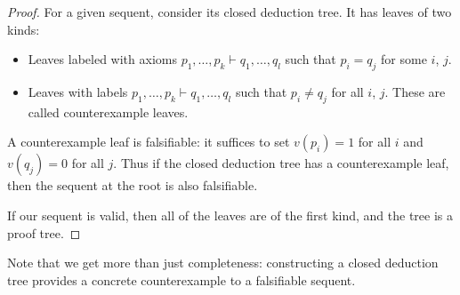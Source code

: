 

\setcounter{section}{2}
\setcounter{subsection}{8}
\setcounter{dfn}{19}

\begin{proof}
For a given sequent, consider its closed deduction tree.
It has leaves of two kinds:
\begin{itemize}
\item
Leaves labeled with axioms $p_1, \ldots, p_k \vdash q_1, \ldots, q_l$ such that $p_i = q_j$ for some $i$, $j$.
\item
Leaves with labels $p_1, \ldots, p_k \vdash q_1, \ldots, q_l$ such that $p_i \ne q_j$ for all $i$, $j$.
These are called counterexample leaves.
\end{itemize}
A counterexample leaf is falsifiable: it suffices to set $v(p_i) = 1$ for all $i$ and $v(q_j) = 0$ for all $j$.
Thus if the closed deduction tree has a counterexample leaf, then the sequent at the root is also falsifiable.

If our sequent is valid, then all of the leaves are of the first kind, and the tree is a proof tree.
\end{proof}

Note that we get more than just completeness: constructing a closed deduction tree provides a concrete counterexample to a falsifiable sequent.



